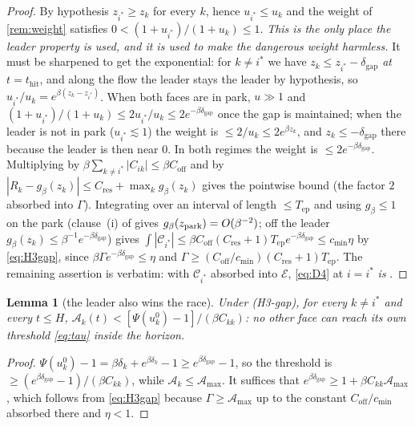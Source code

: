 \documentclass[11pt]{article}
\newtheorem{lemma}[theorem]{Lemma}
\theoremstyle{remark}
\newcommand{\thit}{t_{\mathrm{hit}}}
\newcommand{\Ar}{\mathcal{A}}
\newcommand{\Tep}{T_{\mathrm{ep}}}
\newcommand{\Cres}{C_{\mathrm{res}}}
\newcommand{\dgap}{\delta_{\mathrm{gap}}}
\newcommand{\hyplabel}[1]{\textup{(#1)}}
\begin{document}
\begin{proof}
By hypothesis $z_{i^\ast}\ge z_k$ for every $k$, hence $u_{i^\ast}\le u_k$ and
the weight of \cref{rem:weight} satisfies
$0<(1+u_{i^\ast})/(1+u_k)\le1$. \emph{This is the only place the leader
property is used, and it is used to make the dangerous weight harmless.} It
must be sharpened to get the exponential: for $k\ne i^\ast$ we have
$z_k\le z_{i^\ast}-\dgap$ \emph{at $t=\thit$}, and along the flow the leader
stays the leader by hypothesis, so $u_{i^\ast}/u_k=e^{\beta(z_k-z_{i^\ast})}$.
When both faces are in park, $u\gg1$ and
$(1+u_{i^\ast})/(1+u_k)\le2u_{i^\ast}/u_k\le2e^{-\beta\dgap}$ once the gap is
maintained; when the leader is not in park ($u_{i^\ast}\lesssim1$) the weight is
$\le2/u_k\le2e^{\beta z_k}$, and $z_k\le-\dgap$ there because the leader is then
near $0$. In both regimes the weight is $\le2e^{-\beta\dgap}$. Multiplying by
$\beta\sum_{k\ne i^\ast}|C_{ik}|\le\beta C_{\mathrm{off}}$ and by
$|R_k-g_\beta(z_k)|\le\Cres+\max_kg_\beta(z_k)$ gives the pointwise bound (the
factor $2$ absorbed into $\Gamma$). Integrating over an interval of length
$\le\Tep$ and using $g_\beta\le1$ on the park (clause~(i) of
\cite[Thm.~6]{paper} gives $g_\beta(z_{\rm park})=O(\beta^{-2})$; off the
leader $g_\beta(z_k)\le\beta^{-1}e^{-\beta\dgap}$) gives
$\int|\mathcal C_{i^\ast}|\le\beta C_{\mathrm{off}}(\Cres+1)\Tep
e^{-\beta\dgap}\le c_{\min}\eta$ by \eqref{eq:H3gap}, since
$\beta\Gamma e^{-\beta\dgap}\le\eta$ and
$\Gamma\ge(C_{\mathrm{off}}/c_{\min})(\Cres+1)\Tep$.
The remaining assertion is verbatim: with $\mathcal C_{i^\ast}$ absorbed into
$\mathcal E$, \eqref{eq:D4} at $i=i^\ast$ \emph{is}
\cite[eq.~(quadratureF)]{paper}.
\end{proof}

\begin{lemma}[the leader also wins the race]\label{lem:A2}
Under \hyplabel{H3-gap}, for every $k\ne i^\ast$ and every $t\le H$,
$\Ar_k(t)<[\Psi(u_k^0)-1]/(\beta C_{kk})$: no other face can reach its own
threshold \eqref{eq:tau} inside the horizon.
\end{lemma}

\begin{proof}
$\Psi(u_k^0)-1=\beta\delta_k+e^{\beta\delta_k}-1\ge e^{\beta\dgap}-1$, so the
threshold is $\ge(e^{\beta\dgap}-1)/(\beta C_{kk})$, while
$\Ar_k\le\Ar_{\max}$. It suffices that
$e^{\beta\dgap}\ge1+\beta C_{kk}\Ar_{\max}$, which follows from
\eqref{eq:H3gap} because $\Gamma\ge\Ar_{\max}$ up to the constant
$C_{\mathrm{off}}/c_{\min}$ absorbed there and $\eta<1$.
\end{proof}
\end{document}
